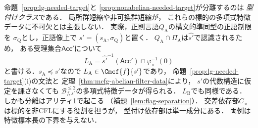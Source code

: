 \begin{remark}[二つの分離例が示すこと]
\label{rem:necessity-scope}
命題~\ref{prop:lg-needed-target}と
\ref{prop:nonabelian-needed-target}が分離するのは
\emph{型付けクラス}である．
局所群短縮や非可換群短縮が，
これらの標的の多項式特徴データに不可欠とは主張しない．
実際，正則言語$Q_{\mathrm A}$の構文的準同型の正語制限を
$\sigma_{\mathrm Q}$とし，正語像上で
$s'=(s_{\mathrm A},\sigma_{\mathrm Q})$と置く．
$Q_{\mathrm A}\cap\Pi_{\mathrm A}$は$\widehat{s'}$で認識されるため，
ある受理集合$\mathsf{Acc}'$について
\[
 L_{\mathrm A}
 =\widehat{s'}^{-1}(\mathsf{Acc}')\cap\varphi_\times^{-1}(0)
\]
と書ける．$s_{\mathrm A}\preceq s'$なので
$L_{\mathrm A}\in\Cmcf{f}{s'}$であり，
命題~\ref{prop:lg-needed-target}(i)の文法と
定理~\ref{thm:mcfg-abelian-filter-data}により，
$s'$の代数構造に仮定を課さなくても
$\mathcal B^{\le2}_{f,s'}$の多項式特徴データが得られる．
$L_{\mathrm B}$でも同様である．
しかも分離はアリティ1で起こる
（補題~\ref{lem:flag-separation}）．
交差依存部$C_\times$は標的を非CFLにする役割を担うが，
型付け依存部は単一成分にある．
両例は特徴標本長の下界を与えない．
\end{remark}
